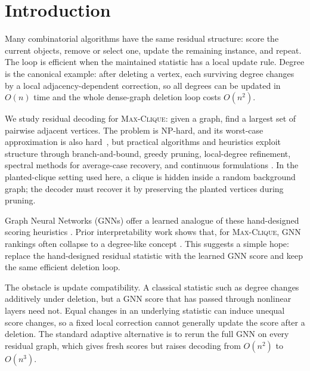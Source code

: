 \documentclass[mathematics,article,submit,pdftex,moreauthors]{Definitions/mdpi}
\begin{document}
\maketitle

\section{Introduction}

Many combinatorial algorithms have the same residual structure: score the current
objects, remove or select one, update the remaining instance, and repeat. The loop is
efficient when the maintained statistic has a local update rule. Degree is the
canonical example: after deleting a vertex, each surviving degree changes by a local
adjacency-dependent correction, so all degrees can be updated in $O(n)$ time and the
whole dense-graph deletion loop costs $O(n^2)$.

We study residual decoding for \textsc{Max-Clique}: given a graph, find a largest
set of pairwise adjacent vertices. The problem is NP-hard, and its worst-case approximation is also hard~\citep{karp1972,feige1996approximating,hastad1999}, but practical algorithms and heuristics exploit structure through branch-and-bound, greedy pruning,
local-degree refinement, spectral methods for average-case recovery, and continuous formulations
\citep{alon1998,wu2015review,gibbons1997continuous,marino2024short}. In the
planted-clique setting used here, a clique is hidden inside a random background graph;
the decoder must recover it by preserving the planted vertices during pruning.

Graph Neural Networks (GNNs) offer a learned analogue of these hand-designed scoring heuristics
\citep{karalias2020,min2022,garmendia2024}. Prior interpretability work shows that,
for \textsc{Max-Clique}, GNN rankings often collapse to a degree-like concept
\citep{ShohamHRV26}. This suggests a simple hope: replace the hand-designed residual
statistic with the learned GNN score and keep the same efficient deletion loop.

The obstacle is update compatibility. A classical statistic such as degree changes
additively under deletion, but a GNN score that has passed through nonlinear layers
need not. Equal changes in an underlying statistic can induce unequal score changes,
so a fixed local correction cannot generally update the score after a deletion. The
standard adaptive alternative is to rerun the full GNN on every residual graph, which gives fresh
scores but raises decoding from $O(n^2)$ to $O(n^3)$.
\end{document}
